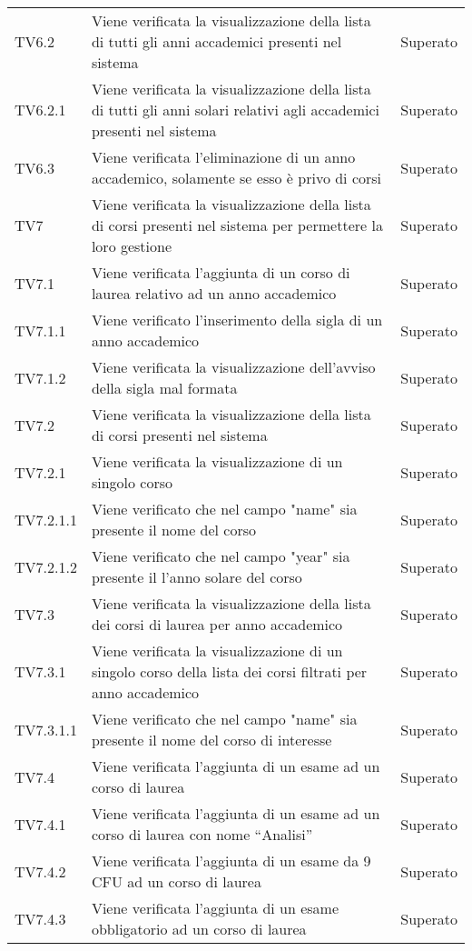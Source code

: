 \documentclass[PianoDiQualifica.tex]{subfiles}
\begin{document}
\begin{longtable}[H]{P{2cm}P{8.5cm}P{3cm}}
	TV6.2 & Viene verificata la visualizzazione della lista di tutti gli anni accademici presenti nel sistema & Superato \\ 
	TV6.2.1 & Viene verificata la visualizzazione della lista di tutti gli anni solari relativi agli accademici presenti nel sistema & Superato \\ 
	TV6.3 & Viene verificata l'eliminazione di un anno accademico, solamente se esso è privo di corsi & Superato \\ 
	TV7 & Viene verificata la visualizzazione della lista di corsi presenti nel sistema per permettere la loro gestione & Superato \\ 
	TV7.1 & Viene verificata l'aggiunta di un corso di laurea relativo ad un anno accademico & Superato \\ 
	TV7.1.1 & Viene verificato l'inserimento della sigla di un anno accademico & Superato \\ 
	TV7.1.2 & Viene verificata la visualizzazione dell'avviso della sigla mal formata & Superato \\ 
	TV7.2 & Viene verificata la visualizzazione della lista di corsi presenti nel sistema & Superato \\ 
	TV7.2.1 & Viene verificata la visualizzazione di un singolo corso & Superato \\ 
	TV7.2.1.1 & Viene verificato che nel campo "name" sia presente il nome del corso & Superato \\ 
	TV7.2.1.2 & Viene verificato che nel campo "year" sia presente il l'anno solare del corso & Superato \\ 
	TV7.3 & Viene verificata la visualizzazione della lista dei corsi di laurea per anno accademico & Superato \\ 
	TV7.3.1 & Viene verificata la visualizzazione di un singolo corso della lista dei corsi filtrati per anno accademico & Superato \\ 
	TV7.3.1.1 & Viene verificato che nel campo "name" sia presente il nome del corso di interesse & Superato \\ 
	TV7.4 & Viene verificata l'aggiunta di un esame ad un corso di laurea & Superato \\ 
	TV7.4.1 & Viene verificata l'aggiunta di un esame ad un corso di laurea con nome “Analisi” & Superato \\ 
	TV7.4.2 & Viene verificata l'aggiunta di un esame da 9 CFU ad un corso di laurea & Superato \\ 
	TV7.4.3 & Viene verificata l'aggiunta di un esame obbligatorio ad un corso di laurea & Superato \\ 

\end{longtable}
\end{document}
